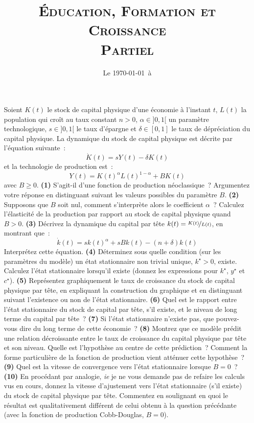 \documentclass[10pt,a4paper,notitlepage]{article}
\newcommand{\question}[1]{\textbf{(#1)}}
\begin{document}
\title{\textsc{Éducation, Formation et Croissance\\ \small{Partiel}}}
\date{Le \today\ à \thistime}

\maketitle
\thispagestyle{empty}

Soient $K(t)$ le stock de capital physique d'une économie à l'instant
$t$, $L(t)$ la population qui croît au taux constant $n>0$,
$\alpha\in]0,1[$ un paramètre technologique, $s\in]0,1[$ le taux
d'épargne et $\delta\in[0,1]$ le taux de dépréciation du capital
physique. La dynamique du stock de capital physique est décrite par
l'équation suivante :
\[
\dot K(t) = sY(t)-\delta K(t)
\]
et la technologie de production est :
\[
Y(t) = K(t)^\alpha L(t)^{1-\alpha} + BK(t)
\]
avec $B\geq 0$. \question{1} S'agit-il d'une fonction de production
néoclassique ? Argumentez votre réponse en distinguant suivant les
valeurs possibles du paramètre $B$. \question{2} Supposons que $B$
soit nul, comment s'interprète alors le coefficient $\alpha$ ? Calculez
l'élasticité de la production par rapport au stock de capital physique
quand $B>0$. \question{3} Décrivez la
dynamique du capital par tête $k(t)=\nicefrac{K(t)}{L(t)}$, en
montrant que :
\[
\dot k(t) = sk(t)^{\alpha}+sBk(t)-(n+\delta)k(t)
\]
Interprétez cette équation. \question{4} Déterminez sous quelle
condition (sur les paramètres du modèle) un état stationnaire non
trivial unique, $k^{\star}>0$, existe. Calculez l'état stationnaire
lorsqu'il existe (donnez les expressions pour $k^{\star}$, $y^{\star}$
et $c^{\star}$). \question{5} Représentez graphiquement le taux de
croissance du stock de capital physique par tête, en expliquant la
construction du graphique et en distinguant suivant l'existence ou non
de l'état stationnaire. \question{6} Quel est le rapport entre l'état
stationnaire du stock de capital par tête, s'il existe, et le niveau de long terme
du capital par tête ? \question{7} Si l'état
stationnaire n'existe pas, que pouvez-vous dire du long terme de cette
économie ? \question{8} Montrez que ce modèle prédit une relation
décroissante entre le taux de croissance du capital physique par tête
et son niveau. Quelle est l'hypothèse au centre de cette prédiction ?
Comment la forme particulière de la fonction de production vient
atténuer cette hypothèse ? \question{9} Quel est la vitesse de
convergence vers l'état stationnaire lorsque $B=0$ ?  \question{10} En
procédant par analogie, \emph{ie} je ne vous demande pas de refaire
les calculs vus en cours, donnez la vitesse d'ajustement vers l'état
stationnaire (s'il existe) du stock de capital physique par
tête. Commentez en soulignant en quoi le résultat est qualitativement
différent de celui obtenu à la question précédante (avec la fonction
de production Cobb-Douglas, $B=0$).
\end{document}
